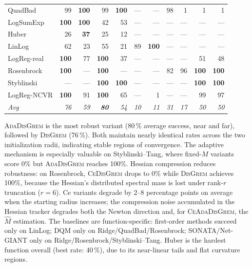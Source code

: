\documentclass[review,onefignum,onetabnum]{siamart171218}
\begin{document}
\begin{table}[htbp]
\begin{tabular}{l rrrr rr rrrr}
			QuadBad     & 99  & \textbf{100} & 99  & \textbf{100} & --- & --- & 98  & 1   & 1   & 1   \\
			LogSumExp   & \textbf{100} & \textbf{100} & 42  & 53  & --- & --- & --- & --- & --- & --- \\
			Huber       & 26  & \textbf{37}  & 25  & 12  & --- & --- & --- & --- & --- & --- \\
			LinLog      & 62  & 23  & 55  & 21  & 89  & \textbf{100} & --- & --- & --- & --- \\
			LogReg-real & \textbf{100} & 77  & \textbf{100} & 37  & --- & --- & --- & --- & 51  & 48  \\
			Rosenbrock  & \textbf{100} & --- & \textbf{100} & --- & --- & --- & 82  & 96  & \textbf{100} & \textbf{100} \\
			Styblinski  & --- & --- & \textbf{100} & \textbf{100} & --- & --- & --- & --- & \textbf{100} & \textbf{100} \\
			LogReg-NCVR & \textbf{100} & 91  & \textbf{100} & 65  & --- & 1   & --- & --- & 99  & 97  \\
			\textit{Avg} & \textit{76} & \textit{59} & \textbf{\textit{80}} & \textit{54}
			& \textit{10} & \textit{11} & \textit{31} & \textit{17}
			& \textit{50} & \textit{50} \\
			\bottomrule
		\end{tabular}
	\end{table}
	
	\textsc{AdaDisGrem} is the most robust variant
	(80\,\% average success, near and far), followed by \textsc{DisGrem} (76\,\%).
	Both maintain nearly identical rates across the two initialization
	radii, indicating stable regions of convergence.
	The adaptive mechanism is especially valuable on
	Styblinski--Tang, where fixed-$M$ variants score 0\% but
	\textsc{AdaDisGrem} reaches 100\%.
	Hessian compression reduces robustness:
	on Rosenbrock, \textsc{CeDisGrem} drops to 0\% while \textsc{DisGrem} achieves 100\%,
	because the Hessian's distributed spectral mass is lost under rank-$r$
	truncation ($r{=}6$).
	Ce variants degrade by 2--8 percentage points on average when
	the starting radius increases; the compression noise accumulated
	in the Hessian tracker degrades both the Newton direction and,
	for \textsc{CeAdaDisGrem}, the $\hat M$ estimation.
	The baselines are function-specific:
	first-order methods succeed only on LinLog; DQM only on
	Ridge/QuadBad/Rosenbrock; SONATA/Net-GIANT only on
	Ridge/Rosenbrock/Styblinski--Tang.
	Huber is the hardest function overall (best rate: 40\,\%),
	due to its near-linear tails and flat curvature regions.
	
\end{document}

